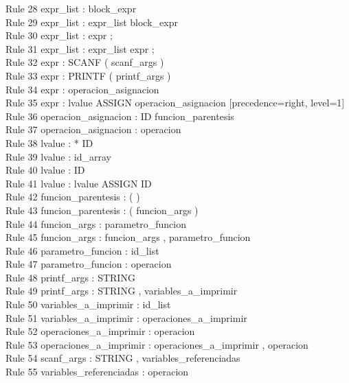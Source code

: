 \documentclass[]{article}
\begin{document}
        Rule 28    expr\_list : block\_expr\\
        Rule 29    expr\_list : expr\_list block\_expr\\
        Rule 30    expr\_list : expr ;\\
        Rule 31    expr\_list : expr\_list expr ;\\
        Rule 32    expr : SCANF ( scanf\_args )\\
        Rule 33    expr : PRINTF ( printf\_args )\\
        Rule 34    expr : operacion\_asignacion\\
        Rule 35    expr : lvalue ASSIGN operacion\_asignacion  [precedence=right, level=1]\\
        Rule 36    operacion\_asignacion : ID funcion\_parentesis\\
        Rule 37    operacion\_asignacion : operacion\\
        Rule 38    lvalue : * ID\\
        Rule 39    lvalue : id\_array\\
        Rule 40    lvalue : ID\\
        Rule 41    lvalue : lvalue ASSIGN ID\\
        Rule 42    funcion\_parentesis : ( )\\
        Rule 43    funcion\_parentesis : ( funcion\_args )\\
        Rule 44    funcion\_args : parametro\_funcion\\
        Rule 45    funcion\_args : funcion\_args , parametro\_funcion\\
        Rule 46    parametro\_funcion : id\_list\\
        Rule 47    parametro\_funcion : operacion\\
        Rule 48    printf\_args : STRING\\
        Rule 49    printf\_args : STRING , variables\_a\_imprimir\\
        Rule 50    variables\_a\_imprimir : id\_list\\
        Rule 51    variables\_a\_imprimir : operaciones\_a\_imprimir\\
        Rule 52    operaciones\_a\_imprimir : operacion\\
        Rule 53    operaciones\_a\_imprimir : operaciones\_a\_imprimir , operacion\\
        Rule 54    scanf\_args : STRING , variables\_referenciadas\\
        Rule 55    variables\_referenciadas : operacion\\
\end{document}
